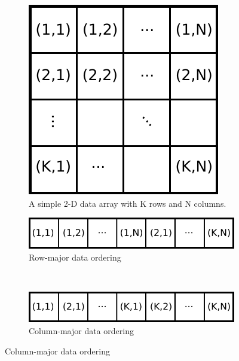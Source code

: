 \documentclass[12pt,number,sort&compress,preprint]{elsarticle}
\begin{document}
\begin{figure}[htb]
  \centering
  \begin{minipage}{0.45\linewidth}
    \begin{subfigure}[t]{\textwidth}
      \includegraphics[width=\textwidth]{data_layouts.pdf}
      \caption{A simple 2-D data array with K rows and N columns.}
      \label{F:mem}
    \end{subfigure}
  \end{minipage}
  \hfil
  \begin{minipage}{0.45\linewidth}
    \begin{subfigure}[t]{\textwidth}
	\includegraphics[width=\textwidth]{row_major.pdf}
	\caption{Row-major data ordering}
	\label{F:row_major}
    \end{subfigure}
    \\
    \begin{subfigure}[t]{\textwidth}
	\includegraphics[width=\textwidth]{column_major.pdf}
	\caption{Column-major data ordering}
	\label{F:column_major}
    \end{subfigure}
  \end{minipage}
\end{figure}
\end{document}
